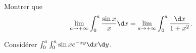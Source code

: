\begin{enonce}
\begin{exercise}[ID={RMS 122-2 E542 Mines-Ponts MP},subtitle={},tags={}, difficulty={0}]
Montrer que
\begin{equation*}
  \lim_{a\to+\infty} \int_0^a \frac{\sin x}{x}\d x
  =
  \lim_{a\to+\infty}\int_0^a\frac{\d x}{1+x^2}.
\end{equation*}
\begin{hint}
  Considérer $\int_0^a\int_0^a \sin xe^{-xy}\d x\d y$.
\end{hint}
\end{exercise}
\begin{solution}
\end{solution}
\end{enonce}
